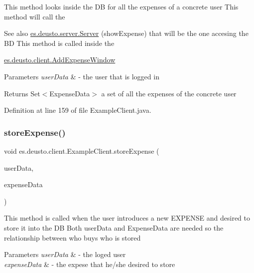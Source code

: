 This method looks inside the DB for all the expenses of a concrete user This method will call the \begin{DoxySeeAlso}{See also}
\hyperlink{classes_1_1deusto_1_1server_1_1_server}{es.\+deusto.\+server.\+Server} (show\+Expense) that will be the one accesing the BD This method is called inside the 

\hyperlink{classes_1_1deusto_1_1client_1_1_add_expense_window}{es.\+deusto.\+client.\+Add\+Expense\+Window} 
\end{DoxySeeAlso}

\begin{DoxyParams}{Parameters}
{\em user\+Data} & -\/ the user that is logged in \\
\hline
\end{DoxyParams}
\begin{DoxyReturn}{Returns}
Set$<$\+Expense\+Data$>$ a set of all the expenses of the concrete user 
\end{DoxyReturn}


Definition at line 159 of file Example\+Client.\+java.

\mbox{\label{classes_1_1deusto_1_1client_1_1_example_client_aba5fe3dfb882ef22d0bd49b5915871d3}} 
\subsubsection{\texorpdfstring{store\+Expense()}{storeExpense()}}
{\footnotesize\ttfamily void es.\+deusto.\+client.\+Example\+Client.\+store\+Expense (\begin{DoxyParamCaption}\item[{\hyperlink{classes_1_1deusto_1_1serialization_1_1_user_data}{User\+Data}}]{user\+Data,  }\item[{\hyperlink{classes_1_1deusto_1_1serialization_1_1_expense_data}{Expense\+Data}}]{expense\+Data }\end{DoxyParamCaption})}

This method is called when the user introduces a new E\+X\+P\+E\+N\+SE and desired to store it into the DB Both user\+Data and Expense\+Data are needed so the relationship between who buys who is stored 
\begin{DoxyParams}{Parameters}
{\em user\+Data} & -\/ the loged user \\
\hline
{\em expense\+Data} & -\/ the expese that he/she desired to store \\
\hline
\end{DoxyParams}


